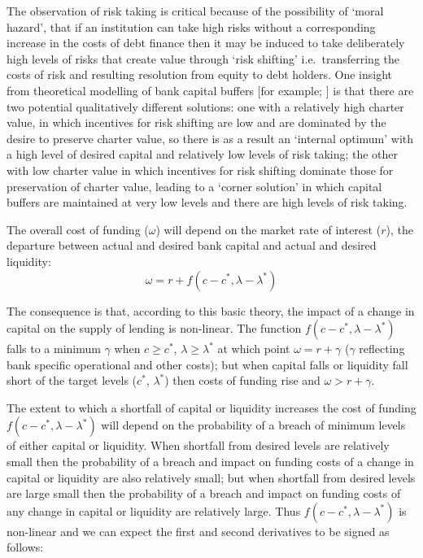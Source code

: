 \documentclass[
]{article}
\begin{document}
The observation of risk taking is critical because of the possibility of `moral hazard', that if an institution can take high risks without a corresponding increase in the costs of debt finance then it may be induced to take deliberately high levels of risks that create value through `risk shifting' i.e.~transferring the costs of risk and resulting resolution from equity to debt holders. One insight from theoretical modelling of bank capital buffers {[}for example; \citet{milne2002bank}{]} is that there are two potential qualitatively different solutions: one with a relatively high charter value, in which incentives for risk shifting are low and are dominated by the desire to preserve charter value, so there is as a result an `internal optimum' with a high level of desired capital and relatively low levels of risk taking; the other with low charter value in which incentives for risk shifting dominate those for preservation of charter value, leading to a `corner solution' in which capital buffers are maintained at very low levels and there are high levels of risk taking.

The overall cost of funding (\(\omega\)) will depend on the market rate of interest (\(r\)), the departure between actual and desired bank capital and actual and desired liquidity:
\[
\omega=r+f(c-c^\ast,\lambda-\lambda^\ast ) 
\]

The consequence is that, according to this basic theory, the impact of a change in capital on the supply of lending is non-linear. The function \(f(c-c^\ast,\lambda-\lambda^\ast )\) falls to a minimum \(\gamma\) when \(c \geq c^\ast\), \(\lambda\geq\lambda^\ast\) at which point \(\omega=r+ \gamma\) (\(\gamma\) reflecting bank specific operational and other costs); but when capital falls or liquidity fall short of the target levels (\(c^\ast\), \(\lambda^\ast\)) then costs of funding rise and \(\omega >r+ \gamma\).

The extent to which a shortfall of capital or liquidity increases the cost of funding \(f(c-c^\ast,\lambda-\lambda^\ast)\) will depend on the probability of a breach of minimum levels of either capital or liquidity. When shortfall from desired levels are relatively small then the probability of a breach and impact on funding costs of a change in capital or liquidity are also relatively small; but when shortfall from desired levels are large small then the probability of a breach and impact on funding costs of any change in capital or liquidity are relatively large. Thus \(f(c-c^\ast,\lambda-\lambda^\ast)\) is non-linear and we can expect the first and second derivatives to be signed as follows:
\end{document}
